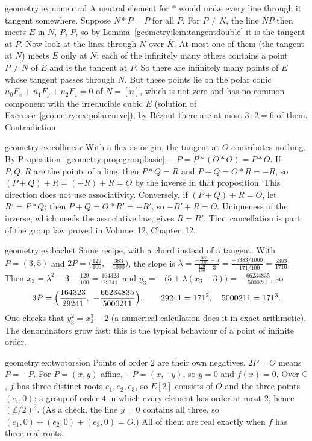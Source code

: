 \begin{solution}{geometry:ex:noneutral}
\idea A neutral element for $*$ would make every line through it tangent somewhere.
\writeup Suppose $N*P=P$ for all $P$. For $P\ne N$, the line $NP$ then meets $E$ in $N$, $P$, $P$, so by Lemma~\ref{geometry:lem:tangentdouble} it is the tangent at
$P$. Now look at the lines through $N$ over $\overline K$. At most one of them (the tangent at $N$) meets $E$ only at $N$; each of the infinitely many others
contains a point $P\ne N$ of $E$ and is the tangent at $P$. So there are infinitely many points of $E$ whose tangent passes through $N$. But these points lie on
the polar conic $n_0F_x+n_1F_y+n_2F_z=0$ of $N=[n]$, which is not zero and has no common component with the irreducible cubic $E$ (solution of
Exercise~\ref{geometry:ex:polarcurve}); by B\'ezout there are at most $3\cdot2=6$ of them. Contradiction.
\end{solution}

\begin{solution}{geometry:ex:collinear}
\idea With a flex as origin, the tangent at $O$ contributes nothing.
\writeup By Proposition~\ref{geometry:prop:groupbasic}, $-P=P*(O*O)=P*O$. If $P,Q,R$ are the points of a line, then $P*Q=R$ and $P+Q=O*R=-R$, so $(P+Q)+R=(-R)+R=O$ by the inverse in that proposition. This direction does not use associativity. Conversely,
if $(P+Q)+R=O$, let $R'=P*Q$; then $P+Q=O*R'=-R'$, so $-R'+R=O$. Uniqueness of the inverse, which needs the associative law, gives $R=R'$. That cancellation is part of the group law proved in Volume~12, Chapter~12.
\end{solution}

\begin{solution}{geometry:ex:bachet}
\idea Same recipe, with a chord instead of a tangent.
\writeup With $P=(3,5)$ and $2P=\bigl(\frac{129}{100},-\frac{383}{1000}\bigr)$, the slope is
$\lambda=\frac{-\frac{383}{1000}-5}{\frac{129}{100}-3}=\frac{-5383/1000}{-171/100}=\frac{5383}{1710}$. Then
$x_3=\lambda^2-3-\frac{129}{100}=\frac{164323}{29241}$ and $y_3=-\bigl(5+\lambda(x_3-3)\bigr)=-\frac{66234835}{5000211}$, so
\[
3P=\Bigl(\frac{164323}{29241},\ -\frac{66234835}{5000211}\Bigr),\qquad 29241=171^2,\quad 5000211=171^3.
\]
One checks that $y_3^2=x_3^3-2$ (a numerical calculation does it in exact arithmetic). The denominators grow fast: this is the typical behaviour of a point of
infinite order.
\end{solution}

\begin{solution}{geometry:ex:twotorsion}
\idea Points of order $2$ are their own negatives.
\writeup $2P=O$ means $P=-P$. For $P=(x,y)$ affine, $-P=(x,-y)$, so $y=0$ and $f(x)=0$. Over $\mathbb C$, $f$ has three distinct roots $e_1,e_2,e_3$, so $E[2]$
consists of $O$ and the three points $(e_i,0)$: a group of order $4$ in which every element has order at most $2$, hence $(\mathbb Z/2)^2$. (As a check, the line
$y=0$ contains all three, so $(e_1,0)+(e_2,0)+(e_3,0)=O$.) All of them are real exactly when $f$ has three real roots.
\end{solution}

